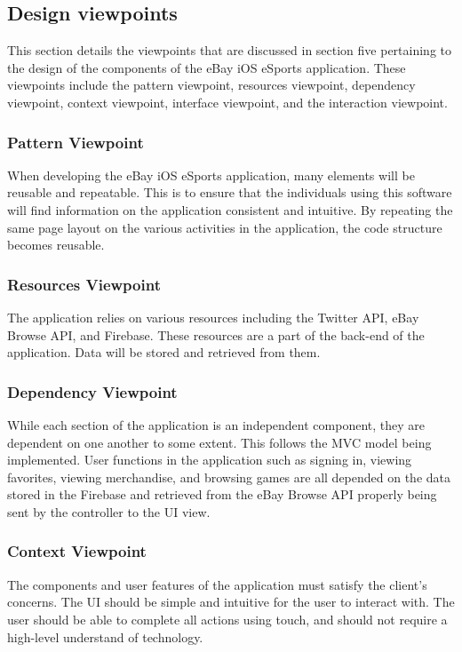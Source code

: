 \documentclass[onecolumn, draftclsnofoot,10pt, compsoc]{IEEEtran}
\begin{document}
\subsection{Design viewpoints}
This section details the viewpoints that are discussed in section five pertaining to the design of the components of the eBay iOS eSports application. These viewpoints include the pattern viewpoint, resources viewpoint, dependency viewpoint, context viewpoint, interface viewpoint, and the interaction viewpoint.

\subsubsection{Pattern Viewpoint}
When developing the eBay iOS eSports application, many elements will be reusable and repeatable. This is to ensure that the individuals using this software will find information on the application consistent and intuitive. By repeating the same page layout on the various activities in the application, the code structure becomes reusable.

\subsubsection{Resources Viewpoint}
The application relies on various resources including the Twitter API, eBay Browse API, and Firebase. These resources are a part of the back-end of the application. Data will be stored and retrieved from them.

\subsubsection{Dependency Viewpoint}
While each section of the application is an independent component, they are dependent on one another to some extent. This follows the MVC model being implemented. User functions in the application such as signing in, viewing favorites, viewing merchandise, and browsing games are all depended on the data stored in the Firebase and retrieved from the eBay Browse API properly being sent by the controller to the UI view.

\subsubsection{Context Viewpoint}
The components and user features of the application must satisfy the client's concerns. The UI should be simple and intuitive for the user to interact with. The user should be able to complete all actions using touch, and should not require a high-level understand of technology.
\end{document}
